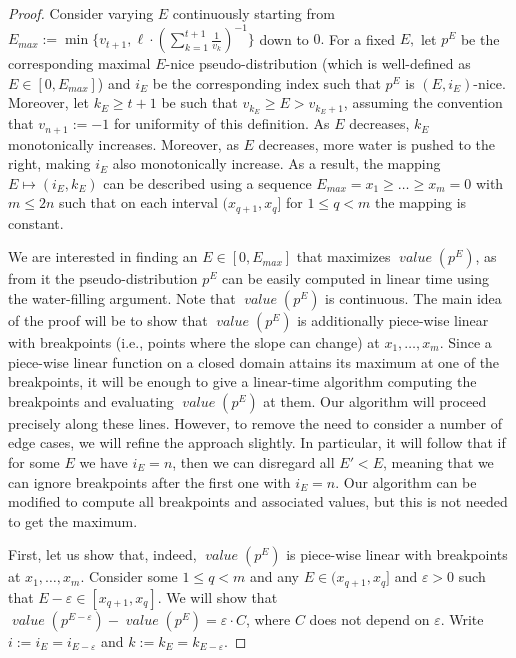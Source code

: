 \documentclass[sigconf,nonacm]{aamas}
\DeclareMathOperator{\valueText}{\textit{value}}
\newcommand{\val}[1]{\valueText({#1})}
\begin{document}
\continoussimulation*
\begin{proof} Consider varying $E$ continuously starting from $E_\mathit{max} := \min\{v_{t + 1}, \ell \cdot (\sum_{k = 1}^{t + 1}\frac{1}{v_k})^{-1}\}$ down to $0.$ For a fixed $E,$ let $p^E$ be the corresponding maximal $E$-nice pseudo-distribution (which is well-defined as $E \in [0, E_\mathit{max}]$) 
and $i_E$ be the corresponding index such that $p^E$ is $(E, i_E)$-nice.  Moreover, let $k_E \geq t + 1$ be such that $v_{k_E} \geq E > v_{k_E + 1}$, assuming the convention that $v_{n + 1} := -1$ for uniformity of this definition. 
As $E$ decreases, $k_E$ monotonically increases. Moreover, as $E$ decreases, more water is pushed to the right, making $i_E$ also monotonically increase. As a result, the mapping $E \mapsto (i_E, k_E)$ can be described using a sequence $E_\mathit{max} = x_1 \geq \dots \geq x_m = 0$ with $m \leq 2n$ such that on each interval $(x_{q + 1}, x_q]$ for $1 \leq q < m$ the mapping is constant.

We are interested in finding an $E \in [0, E_\mathit{max}]$ that maximizes $\val{p^E}$, as from it the pseudo-distribution $p^E$ can be easily computed in linear time using the water-filling argument. Note that $\val{p^E}$ is continuous. The main idea of the proof will be to show that $\val{p^E}$ is additionally piece-wise linear with breakpoints (i.e., points where the slope can change) at $x_1, \dots, x_m$. Since a piece-wise linear function on a closed domain attains its maximum at one of the breakpoints, it will be enough to give a linear-time algorithm computing the breakpoints and evaluating $\val{p^E}$ at them. Our algorithm will proceed precisely along these lines. However, to remove the need to consider a number of edge cases, we will refine the approach slightly. In particular, it will follow that if for some $E$ we have $i_E = n$, then we can disregard all $E' < E$, meaning that we can ignore breakpoints after the first one with $i_E = n$. Our algorithm can be modified to compute all breakpoints and associated values, but this is not needed to get the maximum.

First, let us show that, indeed,
$\val{p^E}$ is piece-wise linear with breakpoints at $x_1, \dots, x_m$. Consider some $1 \leq q < m$ and any  $E \in (x_{q + 1}, x_q]$ and $\varepsilon > 0$ such that $E - \varepsilon \in [x_{q + 1}, x_q]$. We will show that $\val{p^{E - \varepsilon}} - \val{p^E} = \varepsilon \cdot C$, where $C$ does not depend on $\varepsilon$. Write $i := i_E = i_{E - \varepsilon}$ and $k := k_E = k_{E - \varepsilon}$.


\end{proof}
\end{document}
